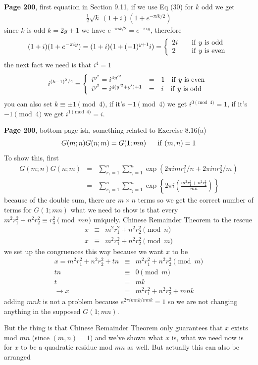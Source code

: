 \documentclass[aps,preprint,preprintnumbers,nofootinbib,showpacs,prd]{revtex4-1}
\newcommand{\nbea}{\begin{eqnarray*}}
\newcommand{\neea}{\end{eqnarray*}}
\begin{document}
{\bf Page 200}, first equation in Section 9.11, if we use Eq (30) for $k$ odd we get
%
\nbea
\frac{1}{2} \sqrt{k}~(1+i)(1 + e^{-\pi i k/2})
\neea
%
since $k$ is odd $k = 2y + 1$ we have $e^{-\pi i k/2} = e^{-\pi i y}$, therefore
%
\nbea
(1+i)(1 + e^{-\pi i y}) = (1 + i)(1 + (-1)^{y+1} i) = \left \{
\begin{array}{l l}
2i & ~~~{\rm if} ~y ~{\rm is~odd} \\
2 & ~~~{\rm if} ~y ~{\rm is~even}
\end{array}
\right.
\neea
%
the next fact we need is that $i^4 = 1$ 
%
\nbea
i^{(k-1)^2/4} = \left\{
\begin{array}{l c l}
i^{y^2} = i^{4y'^2} & = & 1 ~~~{\rm if}~ y ~{\rm is~ even} \\
i^{y^2} = i^{4(y'^2 + y') + 1} & = & i ~~~ {\rm if}~ y {\rm ~is~odd}
\end{array}
\right.
\neea
%
you can also set $k \equiv \pm 1 \pmod{4}$, if it's $+1 \pmod{4}$ we get $i^{0\pmod{4}} = 1$, if it's $-1 \pmod{4}$ we get $i^{1 \pmod{4}} = i$.

{\bf Page 200}, bottom page-ish, something related to Exercise 8.16(a)
%
\nbea
G(m;n)G(n;m) = G(1;mn) ~~~~~ {\rm if}~ (m,n) = 1
\neea
%
To show this, first
%
\nbea
G(m;n)G(n;m) & = & \sum_{r_1=1}^{n}\sum_{r_2=1}^{m} \exp(2\pi i m r_1^2/n + 2\pi i n r_2^2/m) \\
& = & \sum_{r_1=1}^{n}\sum_{r_2=1}^{m} \exp\left \{2\pi i \left (\frac{m^2 r_1^2 + n^2 r_2^2}{mn} \right ) \right \}
\neea
%
because of the double sum, there are $m\times n$ terms so we get the correct number of terms for $G(1;mn)$ what we need to show is that every $m^2 r_1^2 + n^2 r_2^2 \equiv r_3^2 \pmod{mn}$ uniquely. Chinese Remainder Theorem to the rescue
%
\nbea
x & \equiv & m^2 r_1^2 + n^2 r_2^2 \pmod{n} \\
x & \equiv & m^2 r_1^2 + n^2 r_2^2 \pmod{m}
\neea
%
we set up the congruences this way because we want $x$ to be
%
\nbea
x = m^2 r_1^2 + n^2 r_2^2 +tn & \equiv & m^2 r_1^2 + n^2 r_2^2 \pmod{m} \\
tn & \equiv & 0 \pmod{m} \\
t & = & mk \\
\to x & = & m^2 r_1^2 + n^2 r_2^2 +mnk
\neea
%
adding $mnk$ is not a problem because $e^{2\pi i mnk/mnk} = 1$ so we are not changing anything in the supposed $G(1;mn)$.

But the thing is that Chinese Remainder Theorem only guarantees that $x$ exists mod $mn$ (since $(m,n)=1$) and we've shown what $x$ is, what we need now is for $x$ to be a quadratic residue mod $mn$ as well. But actually this can also be arranged
\end{document}
